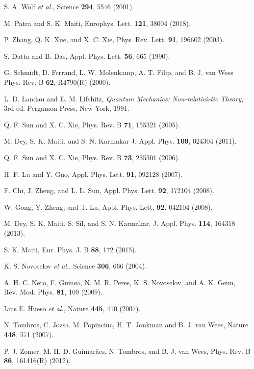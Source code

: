 \documentclass[prb,aps,twocolumn,amsmath,amssymb,floatfix,
superscriptaddress]{revtex4}
\begin{document}
\begin{thebibliography}{99}
 S. A. Wolf {\it et al.}, Science {\bf 294}, 5546
  (2001).

 M. Patra and S. K. Maiti,
  Europhys. Lett. {\bf 121}, 38004 (2018).

 P. Zhang, Q. K. Xue, and X. C. Xie,
  Phys. Rev. Lett. {\bf 91}, 196602 (2003).

 S. Datta and B. Das, Appl. Phys. Lett. {\bf56},
  665 (1990).

 G. Schmidt, D. Ferrand, L. W. Molenkamp,
  A. T. Filip, and B. J. van Wees Phys. Rev. B {\bf62}, R4790(R)
  (2000).

 L. D. Landau and E. M. Lifshitz, \textit{Quantum
  Mechanics: Non-relativistic Theory}, 3rd ed. Pergamon Press, New
  York, 1991.

Q. F. Sun and X. C. Xie, Phys. Rev. B {\bf 71},
  155321 (2005).

 M. Dey, S. K. Maiti, and S. N. Karmakar
  J. Appl. Phys. {\bf 109}, 024304 (2011).

 Q. F. Sun and X. C. Xie, Phys. Rev. B {\bf 73},
  235301 (2006).

 H. F. Lu and Y. Guo, Appl. Phys. Lett. {\bf 91}, 092128
  (2007).

 F. Chi, J. Zheng, and L. L. Sun,
  Appl. Phys. Lett. {\bf 92}, 172104 (2008).

W. Gong, Y. Zheng, and T. Lu, Appl. Phys. Lett. {\bf
  92}, 042104 (2008).

 M. Dey, S. K. Maiti, S. Sil, and S. N. Karmakar,
  J. Appl. Phys. {\bf 114}, 164318 (2013).

 S. K. Maiti, Eur. Phys. J. B {\bf 88}, 172
  (2015).

 K. S. Novoselov {\it et al.}, Science {\bf 306}, 666
  (2004).

 A. H. C. Neto, F. Guinea, N. M. R. Peres,
  K. S. Novoselov, and A. K. Geim, Rev. Mod. Phys. {\bf 81}, 109
  (2009).

 Luis E. Hueso {\it et al.}, Nature {\bf 445}, 410
  (2007).

 N. Tombros, C. Jozsa, M. Popinciuc, H. T. Jonkman
  and B. J. van Wees, Nature {\bf 448}, 571 (2007).

 P. J. Zomer, M. H. D. Guimar\~{a}es, N. Tombros, and
  B. J. van Wees, Phys. Rev. B {\bf 86}, 161416(R) (2012).


\end{thebibliography}
\end{document}
